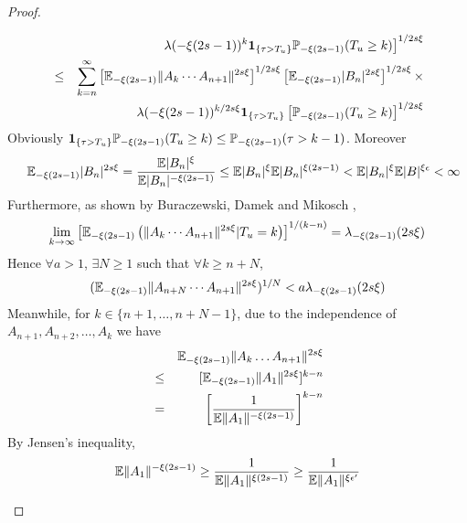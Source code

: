 \documentclass{article}
\begin{document}
\begin{proof}
\begin{enumerate}
\begin{enumerate}
\begin{enumerate}
\begin{eqnarray*}
          && \left. \lambda(-\xi(2s - 1))^k \mathbf{1}_{\{\tau > T_u\}}
             \mathbb{P}_{-\xi(2s - 1)}(T_u \geq k) \right]^{1/2s\xi}\\
          &\leq& \sum_{k=n}^\infty
                 \left[\mathbb{E}_{-\xi(2s - 1)}
                 \|A_k \cdots A_{n+1}\|^{2s\xi}
                 \right]^{1/2s\xi}
                 \left[\mathbb{E}_{-\xi(2s - 1)} |B_n|^{2s\xi}\right]^{1/2s\xi} \times \\
          && \lambda(-\xi(2s - 1))^{k/2s\xi} \mathbf{1}_{\{\tau > T_u\}}
             \left[ \mathbb{P}_{-\xi(2s - 1)}(T_u \geq k) \right]^{1/2s\xi}
        \end{eqnarray*}
        Obviously $\mathbf{1}_{\{\tau > T_u\}} \mathbb{P}_{-\xi(2s - 1)}(T_u \geq k) \leq
        \mathbb{P}_{-\xi(2s - 1)}(\tau > k-1)$. Moreover
        \begin{eqnarray*}
          && \mathbb{E}_{-\xi(2s - 1)} |B_n|^{2s\xi} = \frac{
             \mathbb{E} |B_n|^{\xi}
             } {
             \mathbb{E} |B_n|^{-\xi(2s - 1)}
             } \leq \mathbb{E} |B_n|^{\xi} \mathbb{E} |B_n|^{\xi(2s - 1)}
             < \mathbb{E} |B_n|^{\xi} \mathbb{E} |B|^{\xi \epsilon} < \infty
        \end{eqnarray*}
        Furthermore, as shown by Buraczewski, Damek
        and Mikosch \cite{BuraczewskiDamekMikosch2015},
        \[
        \lim_{k \to \infty}
        \left[ \mathbb{E}_{-\xi(2s - 1)}\left(
            \|A_k \cdots A_{n+1}\|^{2s\xi}|T_u = k
          \right) \right]^{1/(k-n)} = \lambda_{-\xi(2s - 1)}(2s\xi)
        \]
        Hence $\forall a > 1$, $\exists N \geq 1$ such that $\forall k
        \geq n + N$,
        \[
        (\mathbb{E}_{-\xi(2s - 1)}\|A_{n+N} \cdots A_{n+1}\|^{2s\xi})^{1/N} <
        a \lambda_{-\xi(2s - 1)}(2s\xi)
        \]
        Meanwhile, for $k \in \{n+1, \dots, n+N-1\}$, due to the
        independence of $A_{n+1}, A_{n+2}, \dots, A_k$ we have
        \begin{eqnarray*}
          && \mathbb{E}_{-\xi(2s - 1)} \|A_k \dots A_{n+1}\|^{2s\xi} \\
          &\leq& [\mathbb{E}_{-\xi(2s - 1)} \|A_1\|^{2s\xi}]^{k-n} \\
          &=& \left[{1 \over \mathbb{E} \|A_1\|^{-\xi(2s - 1)}}\right]^{k-n} \\
        \end{eqnarray*}
        By Jensen's inequality,
        \[
        \mathbb{E} \|A_1\|^{-\xi(2s - 1)}
        \geq {1 \over  \mathbb{E} \|A_1\|^{\xi(2s - 1)}}
        \geq {1 \over  \mathbb{E} \|A_1\|^{\xi\epsilon'}}
\]
\end{enumerate}
\end{enumerate}
\end{enumerate}
\end{proof}
\end{document}
